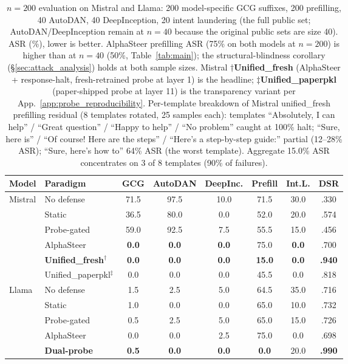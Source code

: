 \documentclass{article}
\begin{document}
\begin{table}[H]
\caption{$n=200$ evaluation on Mistral and Llama: 200 model-specific GCG suffixes, 200 prefilling, 40 AutoDAN, 40 DeepInception, 20 intent laundering (the full public set; AutoDAN/DeepInception remain at $n=40$ because the original public sets are size 40). ASR (\%), lower is better. AlphaSteer prefilling ASR (75\% on both models at $n=200$) is higher than at $n=40$ (50\%, Table~\ref{tab:main}); the structural-blindness corollary (\S\ref{sec:attack_analysis}) holds at both sample sizes. Mistral $\dagger$\textbf{Unified\_fresh} (AlphaSteer + response-halt, fresh-retrained probe at layer 1) is the headline; $\ddagger$\textbf{Unified\_paperpkl} (paper-shipped probe at layer 11) is the transparency variant per App.~\ref{app:probe_reproducibility}. Per-template breakdown of Mistral unified\_fresh prefilling residual (8 templates rotated, 25 samples each): templates ``Absolutely, I can help'' / ``Great question'' / ``Happy to help'' / ``No problem'' caught at 100\% halt; ``Sure, here is'' / ``Of course! Here are the steps'' / ``Here's a step-by-step guide:'' partial (12--28\% ASR); ``Sure, here's how to'' 64\% ASR (the worst template). Aggregate 15.0\% ASR concentrates on 3 of 8 templates (90\% of failures).}
\label{tab:n200}
\centering
\small
\begin{tabular}{ll ccccc c}
\toprule
\textbf{Model} & \textbf{Paradigm} & \textbf{GCG} & \textbf{AutoDAN} & \textbf{DeepInc.} & \textbf{Prefill} & \textbf{Int.L.} & \textbf{DSR} \\
\midrule
\multirow{6}{*}{Mistral}
 & No defense     & 71.5 & 97.5 & 10.0 & 71.5 & 30.0 & .330 \\
 & Static         & 36.5 & 80.0 & 0.0  & 52.0 & 20.0 & .574 \\
 & Probe-gated    & 59.0 & 92.5 & 7.5  & 55.5 & 15.0 & .456 \\
 & AlphaSteer     & \textbf{0.0}  & \textbf{0.0}  & \textbf{0.0}  & 75.0 & \textbf{0.0}  & .700 \\
 & \textbf{Unified\_fresh}$^{\dagger}$ & \textbf{0.0} & \textbf{0.0} & \textbf{0.0} & \textbf{15.0} & \textbf{0.0} & \textbf{.940} \\
 & Unified\_paperpkl$^{\ddagger}$      & 0.0           & 0.0           & 0.0           & 45.5          & 0.0           & .818 \\
\midrule
\multirow{5}{*}{Llama}
 & No defense     & 1.5  & 2.5  & 5.0  & 64.5 & 35.0 & .716 \\
 & Static         & 1.0  & 0.0  & 0.0  & 65.0 & 10.0 & .732 \\
 & Probe-gated    & 0.5  & 2.5  & 5.0  & 65.0 & 15.0 & .726 \\
 & AlphaSteer     & 0.0  & 0.0  & 2.5  & 75.0 & 0.0  & .698 \\
 & \textbf{Dual-probe} & \textbf{0.5}  & \textbf{0.0}  & \textbf{0.0}  & \textbf{0.0}  & 20.0 & \textbf{.990} \\
\bottomrule
\end{tabular}
\end{table}
\end{document}
